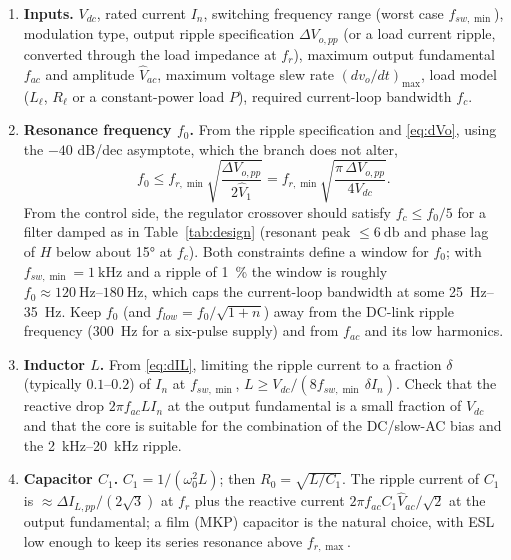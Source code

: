 \documentclass[11pt,a4paper]{article}
\begin{document}
\begin{enumerate}[leftmargin=*]
\item \textbf{Inputs.} $V_{dc}$, rated current $I_n$, switching frequency range
      (worst case $f_{sw,\min}$), modulation type, output ripple specification
      $\Delta V_{o,pp}$ (or a load current ripple, converted through the load impedance at
      $f_r$), maximum output fundamental $f_{ac}$ and amplitude $\hat V_{ac}$, maximum
      voltage slew rate $(dv_o/dt)_{\max}$, load model ($L_\ell$, $R_\ell$ or a
      constant-power load $P$), required current-loop bandwidth $f_c$.

\item \textbf{Resonance frequency $f_0$.} From the ripple specification and
      \eqref{eq:dVo}, using the $-40$ dB/dec asymptote, which the branch does not alter,
      \begin{equation}
      f_0 \le f_{r,\min}\sqrt{\frac{\Delta V_{o,pp}}{2 \hat V_1}}
          = f_{r,\min}\sqrt{\frac{\pi\,\Delta V_{o,pp}}{4 V_{dc}}}.
      \label{eq:f0max}
      \end{equation}
      From the control side, the regulator crossover should satisfy $f_c \le f_0/5$ for a
      filter damped as in Table~\ref{tab:design} (resonant peak $\le \SI{6}{\decibel}$ and
      phase lag of $H$ below about \ang{15} at $f_c$). Both constraints define a window
      for $f_0$; with $f_{sw,\min} = \SI{1}{\kilo\hertz}$ and a ripple of
      \SI{1}{\percent} the window is roughly $f_0 \approx \SIrange{120}{180}{\hertz}$,
      which caps the current-loop bandwidth at some \SIrange{25}{35}{\hertz}. Keep $f_0$
      (and $f_{low} = f_0/\sqrt{1+n}$) away from the DC-link ripple frequency
      (\SI{300}{\hertz} for a six-pulse supply) and from $f_{ac}$ and its low harmonics.

\item \textbf{Inductor $L$.} From \eqref{eq:dIL}, limiting the ripple current to a
      fraction $\delta$ (typically $0.1$--$0.2$) of $I_n$ at $f_{sw,\min}$,
      $L \ge V_{dc}/(8 f_{sw,\min}\,\delta I_n)$. Check that the reactive drop
      $2\pi f_{ac} L I_n$ at the output fundamental is a small fraction of $V_{dc}$ and that
      the core is suitable for the combination of the DC/slow-AC bias and the
      \SIrange{2}{20}{\kilo\hertz} ripple.

\item \textbf{Capacitor $C_1$.} $C_1 = 1/(\omega_0^2 L)$; then $R_0 = \sqrt{L/C_1}$. The
      ripple current of $C_1$ is $\approx \Delta I_{L,pp}/(2\sqrt 3)$ at $f_r$ plus the
      reactive current $2\pi f_{ac} C_1 \hat V_{ac}/\sqrt 2$ at the output fundamental;
      a film (MKP) capacitor is the natural choice, with ESL low enough to keep its series
      resonance above $f_{r,\max}$.


\end{enumerate}
\end{document}
